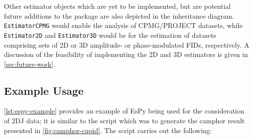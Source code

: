 Other estimator objects which are yet to be implemented, but are potential
future additions to the package are also depicted in the inheritance diagram.
\texttt{EstimatorCPMG} would enable the analysis of \ac{CPMG}/\ac{PROJECT} datasets,
while \texttt{Estimator2D} and \texttt{Estimator3D} would be
for the estimation of datasets comprising sets of \ac{2D} or \ac{3D} amplitude-
or phase-modulated \acp{FID}, respectively. A discussion of the feasibility of
implementing the \ac{2D} and \ac{3D} estimators is given in
\cref{sec:future-work}.

\subsection{Example Usage}
\cref{lst:espy-example} provides an example of \ac{EsPy} being used for the
consideration of \ac{2DJ} data; it is similar to the script which was to
generate the camphor result presented in \cref{fig:camphor-cupid}.  The script
carries out the following:
